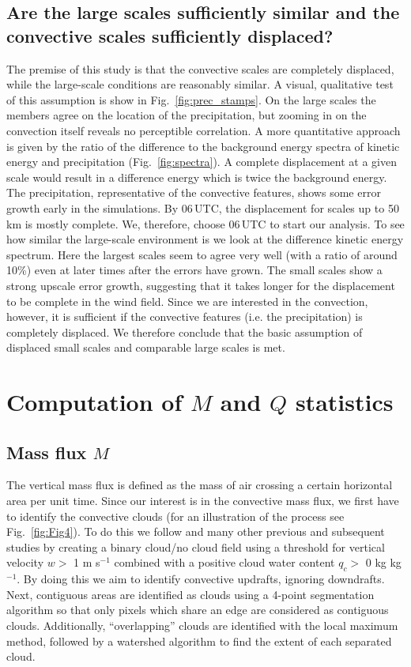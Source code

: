 \documentclass[a4paper, 12pt]{article}
\begin{document}
\subsection{Are the large scales sufficiently similar and the convective scales sufficiently displaced?} 
The premise of this study is that the convective scales are completely displaced, while the large-scale conditions are reasonably similar. A visual, qualitative test of this assumption is show in Fig.~\ref{fig:prec_stamps}. On the large scales the members agree on the location of the precipitation, but zooming in on the convection itself reveals no perceptible correlation. A more quantitative approach is given by the ratio of the difference to the background energy spectra of kinetic energy and precipitation (Fig.~\ref{fig:spectra}). A complete displacement at a given scale would result in a difference energy which is twice the background energy. The precipitation, representative of the convective features, shows some error growth early in the simulations. By 06\,UTC, the displacement for scales up to 50\,km is mostly complete. We, therefore, choose 06\,UTC to start our analysis. To see how similar the large-scale environment is we look at the difference kinetic energy spectrum. Here the largest scales seem to agree very well (with a ratio of around 10\%) even at later times after the errors have grown. The small scales show a strong upscale error growth, suggesting that it takes longer for the displacement to be complete in the wind field. Since we are interested in the convection, however, it is sufficient if the convective features (i.e. the precipitation) is completely displaced. We therefore conclude that the basic assumption of displaced small scales and comparable large scales is met.


\section{Computation of $M$ and $Q$ statistics}

\subsection{Mass flux $M$}
The vertical mass flux is defined as the mass of air crossing a certain horizontal area per unit time. Since our interest is in the convective mass flux, we first have to identify the convective clouds (for an illustration of the process see Fig.~\ref{fig:Fig4}). To do this we follow \cite{Cohen2006} and many other previous and subsequent studies by creating a binary cloud/no cloud field using a threshold for vertical velocity $w >$ 1 m s$^{-1}$ combined with a positive cloud water content $q_c >$ 0 kg kg$^{-1}$. By doing this we aim to identify convective updrafts, ignoring downdrafts. Next, contiguous areas are identified as clouds using a 4-point segmentation algorithm so that only pixels which share an edge are considered as contiguous clouds. Additionally, ``overlapping'' clouds are identified with the local maximum method, followed by a watershed algorithm to find the extent of each separated cloud.
\end{document}

